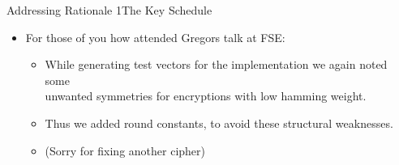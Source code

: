 \begin{frame}{Addressing Rationale 1}{The Key Schedule}
{{\begin{itemize}
        \item For those of you how attended Gregors talk at FSE:
              \begin{itemize}
                  \item While generating test vectors for the implementation we again noted some\\
                        unwanted symmetries for encryptions with low hamming weight.
                  \item Thus we added round constants, to avoid these structural weaknesses.
                  \item (Sorry for fixing another cipher)
              \end{itemize}
    \end{itemize}}}
\end{frame}

